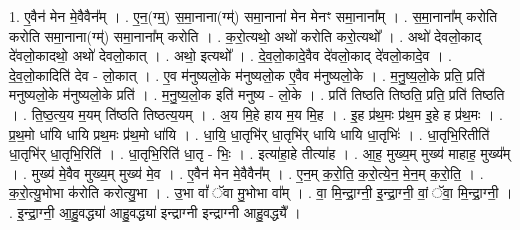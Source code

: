 \documentclass[17pt]{extarticle}
\begin{document}
1. ए॒वैन॑ मेन मे॒वैवैन᳚म् । . ए॒न॒(ग्म्॒) स॒मा॒नाना(ग्म्॑) समा॒नाना॑ मेन मेनꣳ समा॒नाना᳚म् । . स॒मा॒नाना᳚म् करोति करोति समा॒नाना(ग्म्॑) समा॒नाना᳚म् करोति । . क॒रो॒त्यथो॒ अथो॑ करोति करो॒त्यथो᳚ । . अथो॑ देवलो॒काद् दे॑वलो॒कादथो॒ अथो॑ देवलो॒कात् । . अथो॒ इत्यथो᳚ । . दे॒व॒लो॒कादे॒वैव दे॑वलो॒काद् दे॑वलो॒कादे॒व । . दे॒व॒लो॒कादिति॑ देव - लो॒कात् । . ए॒व म॑नुष्यलो॒के म॑नुष्यलो॒क ए॒वैव म॑नुष्यलो॒के । . म॒नु॒ष्य॒लो॒के प्रति॒ प्रति॑ मनुष्यलो॒के म॑नुष्यलो॒के प्रति॑ । . म॒नु॒ष्य॒लो॒क इति॑ मनुष्य - लो॒के । . प्रति॑ तिष्ठति तिष्ठति॒ प्रति॒ प्रति॑ तिष्ठति । . ति॒ष्ठ॒त्य॒य म॒यम् ति॑ष्ठति तिष्ठत्य॒यम् । . अ॒य मि॒हे हाय म॒य मि॒ह । . इ॒ह प्र॑थ॒मः प्र॑थ॒म इ॒हे ह प्र॑थ॒मः । . प्र॒थ॒मो धा॑यि धायि प्रथ॒मः प्र॑थ॒मो धा॑यि । . धा॒यि॒ धा॒तृभि॑र् धा॒तृभि॑र् धायि धायि धा॒तृभिः॑ । . धा॒तृभि॒रितीति॑ धा॒तृभि॑र् धा॒तृभि॒रिति॑ । . धा॒तृभि॒रिति॑ धा॒तृ - भिः॒ । . इत्या॑हा॒हे तीत्या॑ह । . आ॒ह॒ मुख्य॒म् मुख्य॑ माहाह॒ मुख्य᳚म् । . मुख्य॑ मे॒वैव मुख्य॒म् मुख्य॑ मे॒व । . ए॒वैन॑ मेन मे॒वैवैन᳚म् । . ए॒न॒म् क॒रो॒ति॒ क॒रो॒त्ये॒न॒ मे॒न॒म् क॒रो॒ति॒ । . क॒रो॒त्यु॒भोभा क॑रोति करोत्यु॒भा । . उ॒भा वां᳚ ॅवा मु॒भोभा वा᳚म् । . वा॒ मि॒न्द्रा॒ग्नी॒ इ॒न्द्रा॒ग्नी॒ वां॒ ॅवा॒ मि॒न्द्रा॒ग्नी॒ । . इ॒न्द्रा॒ग्नी॒ आ॒हु॒वद्ध्या॑ आहु॒वद्ध्या॑ इन्द्राग्नी इन्द्राग्नी आहु॒वद्ध्यै᳚ । \newline
\end{document}
